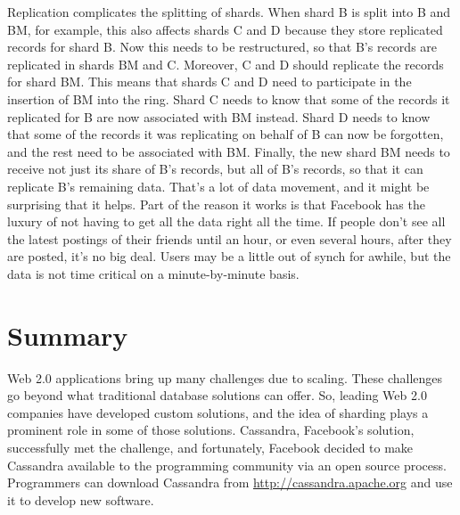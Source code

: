 Replication complicates the splitting of shards.
When shard B is split into B and BM, for example, this also affects shards C and D
because they store replicated records for shard B.
Now this needs to be restructured, so that B's records are replicated in shards BM and C.
Moreover, C and D should replicate the records for shard BM.
This means that shards C and D need 
to participate in the insertion of BM into the ring.
Shard C needs to know that some of the records
it replicated for B are now associated with BM instead.
Shard D needs to know that some of the records it was replicating
on behalf of B can now be forgotten, and the rest need to be associated with BM.
Finally, the new shard BM needs to receive not just its share
of B's records, but all of B's records, so that it can replicate B's remaining data.
That's a lot of data movement, and it might be surprising that it helps.
Part of the reason it works is that Facebook has the luxury of not having
to get all the data right all the time.
If people don't see all the latest postings of their friends until
an hour, or even several hours, after they are posted, it's no big deal.
Users may be a little out of synch for awhile, but the data is not time critical
on a minute-by-minute basis.

\section{Summary}

Web 2.0 applications bring up many challenges due to scaling.
These challenges go beyond what traditional database solutions can offer.
So, leading Web 2.0 companies have developed custom solutions,
and the idea of sharding plays a prominent role in some of those solutions.
Cassandra, Facebook's solution, successfully met the challenge, and
fortunately, Facebook decided to make Cassandra available to the
programming community via an open source process.
Programmers can download Cassandra from \url{http://cassandra.apache.org}
and use it to develop new software.

